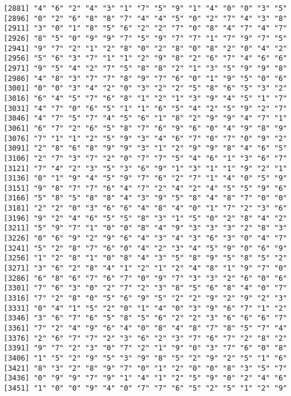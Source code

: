 \documentclass{article}
\begin{document}
\begin{itemize}
\begin{scriptsize}
\begin{verbatim}
[2881] "4" "6" "2" "4" "3" "1" "7" "5" "9" "1" "4" "0" "0" "3" "5"
[2896] "0" "2" "6" "8" "8" "7" "4" "4" "5" "0" "2" "7" "4" "3" "8"
[2911] "3" "0" "1" "8" "5" "6" "2" "2" "7" "0" "8" "4" "7" "4" "7"
[2926] "8" "5" "0" "9" "9" "7" "5" "9" "7" "7" "1" "7" "9" "7" "5"
[2941] "9" "7" "2" "1" "2" "8" "0" "2" "8" "0" "8" "2" "0" "4" "2"
[2956] "5" "6" "3" "7" "1" "1" "2" "9" "8" "2" "6" "7" "4" "6" "6"
[2971] "9" "5" "4" "2" "7" "5" "8" "8" "2" "1" "3" "5" "9" "9" "8"
[2986] "4" "8" "3" "7" "7" "8" "9" "7" "6" "0" "1" "9" "5" "0" "6"
[3001] "0" "0" "3" "4" "2" "0" "3" "2" "2" "5" "8" "6" "5" "3" "2"
[3016] "6" "4" "5" "7" "6" "8" "1" "2" "1" "3" "9" "4" "5" "1" "7"
[3031] "4" "7" "0" "6" "5" "1" "1" "6" "5" "4" "2" "5" "9" "2" "7"
[3046] "4" "7" "5" "7" "4" "5" "6" "1" "8" "2" "9" "9" "4" "7" "1"
[3061] "6" "7" "2" "6" "5" "8" "7" "6" "9" "6" "0" "4" "9" "8" "9"
[3076] "7" "1" "1" "2" "5" "9" "3" "4" "6" "7" "0" "7" "0" "9" "2"
[3091] "2" "8" "6" "8" "9" "9" "3" "1" "2" "9" "9" "8" "4" "6" "5"
[3106] "2" "7" "3" "7" "2" "0" "7" "7" "5" "4" "6" "1" "3" "6" "7"
[3121] "7" "4" "2" "3" "5" "3" "6" "9" "1" "3" "1" "1" "9" "2" "1"
[3136] "0" "1" "9" "4" "5" "9" "7" "6" "2" "7" "1" "4" "0" "5" "9"
[3151] "9" "8" "7" "7" "6" "4" "7" "2" "4" "2" "4" "5" "5" "9" "6"
[3166] "5" "8" "5" "8" "8" "4" "3" "9" "5" "8" "4" "8" "7" "0" "0"
[3181] "2" "2" "0" "3" "6" "6" "4" "8" "4" "0" "1" "7" "2" "3" "6"
[3196] "9" "2" "4" "6" "5" "5" "8" "3" "1" "5" "0" "2" "8" "4" "2"
[3211] "5" "9" "7" "1" "0" "0" "8" "4" "9" "3" "3" "3" "2" "8" "3"
[3226] "0" "6" "9" "2" "9" "6" "4" "3" "4" "3" "6" "3" "0" "4" "7"
[3241] "5" "2" "8" "7" "6" "0" "4" "2" "3" "4" "5" "9" "0" "6" "9"
[3256] "1" "2" "8" "1" "0" "8" "4" "3" "5" "8" "9" "5" "8" "5" "2"
[3271] "3" "6" "2" "8" "4" "1" "2" "1" "2" "4" "8" "1" "9" "7" "0"
[3286] "6" "8" "6" "7" "6" "7" "0" "9" "7" "3" "3" "2" "6" "0" "6"
[3301] "7" "6" "3" "0" "2" "7" "2" "3" "8" "5" "6" "8" "4" "0" "7"
[3316] "7" "2" "8" "0" "5" "6" "9" "5" "2" "2" "9" "2" "9" "2" "3"
[3331] "0" "4" "1" "5" "2" "0" "1" "4" "0" "3" "9" "6" "7" "1" "2"
[3346] "3" "6" "7" "6" "5" "8" "5" "6" "2" "2" "3" "6" "6" "6" "7"
[3361] "7" "2" "4" "9" "6" "4" "0" "8" "4" "8" "7" "8" "5" "7" "4"
[3376] "2" "6" "7" "7" "2" "3" "6" "2" "3" "7" "6" "7" "2" "8" "2"
[3391] "9" "7" "2" "3" "0" "7" "2" "1" "9" "0" "3" "7" "6" "0" "8"
[3406] "1" "5" "2" "9" "5" "3" "9" "8" "5" "2" "9" "2" "5" "1" "6"
[3421] "8" "3" "2" "8" "9" "7" "0" "1" "2" "0" "0" "8" "3" "5" "7"
[3436] "0" "9" "9" "7" "9" "1" "4" "1" "2" "5" "9" "0" "2" "4" "6"
[3451] "1" "0" "0" "9" "4" "0" "7" "7" "6" "5" "2" "5" "1" "2" "9"

\end{verbatim}
\end{scriptsize}
\end{itemize}
\end{document}
